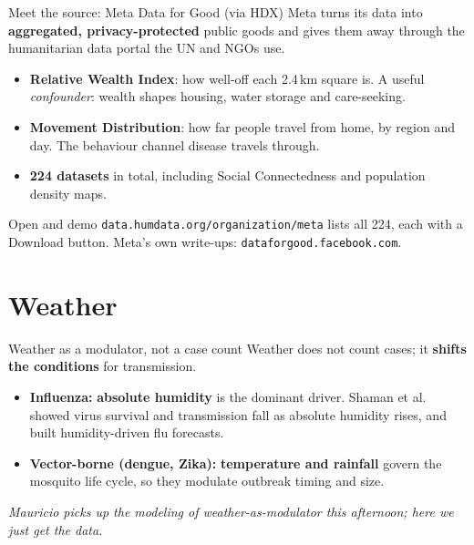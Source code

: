 \documentclass[aspectratio=169,11pt]{beamer}
\begin{document}
\begin{frame}{Meet the source: Meta Data for Good (via HDX)}
  Meta turns its data into \textbf{aggregated, privacy-protected} public goods and gives them
  away through the humanitarian data portal the UN and NGOs use.
  \begin{itemize}
    \item \textbf{Relative Wealth Index}: how well-off each 2.4\,km square is. A useful
          \emph{confounder}: wealth shapes housing, water storage and care-seeking.
    \item \textbf{Movement Distribution}: how far people travel from home, by region and day.
          The behaviour channel disease travels through.
    \item \textbf{224 datasets} in total, including Social Connectedness and population
          density maps.
  \end{itemize}
  \begin{exampleblock}{Open and demo}
    \texttt{data.humdata.org/organization/meta} lists all 224, each with a Download button.
    Meta's own write-ups: \texttt{dataforgood.facebook.com}.
  \end{exampleblock}
\end{frame}

\section{Weather}

\begin{frame}{Weather as a modulator, not a case count}
  Weather does not count cases; it \textbf{shifts the conditions} for transmission.
  \begin{itemize}
    \item \textbf{Influenza:} \textbf{absolute humidity} is the dominant driver. Shaman et
          al. showed virus survival and transmission fall as absolute humidity rises, and
          built humidity-driven flu forecasts.
    \item \textbf{Vector-borne (dengue, Zika):} \textbf{temperature and rainfall} govern the
          mosquito life cycle, so they modulate outbreak timing and size.
  \end{itemize}
  \vspace{0.3em}
  \begin{center}
    \itshape Mauricio picks up the modeling of weather-as-modulator this afternoon; here we
    just get the data.
  \end{center}
\end{frame}
\end{document}
